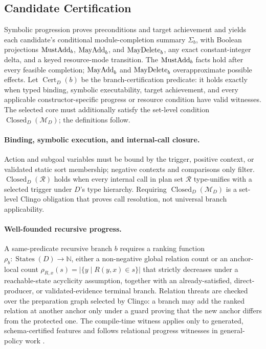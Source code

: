 \subsection{Candidate Certification}

Symbolic progression proves preconditions and target achievement and yields each
candidate's conditional module-completion summary $\Sigma_b$, with Boolean
projections $\mathrm{MustAdd}_b$, $\mathrm{MayAdd}_b$, and $\mathrm{MayDelete}_b$, any exact
constant-integer delta, and a keyed resource-mode transition. The $\mathrm{MustAdd}_b$
facts hold after every feasible completion; $\mathrm{MayAdd}_b$ and $\mathrm{MayDelete}_b$
overapproximate possible effects. Let $\operatorname{Cert}_D(b)$ be the
branch-certification predicate: it holds exactly when typed binding, symbolic
executability, target achievement, and every applicable constructor-specific
progress or resource condition have valid witnesses. The selected core must
additionally satisfy the set-level condition
$\operatorname{Closed}_D(\mathcal M_D)$; the definitions follow.

\paragraph{Binding, symbolic execution, and internal-call closure.}
Action and subgoal variables must be bound by the trigger, positive context, or
validated static sort membership; negative contexts and comparisons only
filter.
$\operatorname{Closed}_D(\mathcal R)$ holds when every internal call in plan set
$\mathcal R$ type-unifies with a selected trigger under $D$'s type hierarchy.
Requiring $\operatorname{Closed}_D(\mathcal M_D)$ is a set-level Clingo
obligation that proves call resolution, not universal branch applicability.

\paragraph{Well-founded recursive progress.}
A same-predicate recursive branch $b$ requires a ranking function
$\rho_b:\operatorname{States}(D)\rightarrow\mathbb N$, either a non-negative
global relation count or an anchor-local count
$\rho_{R,x}(s)=|\{y\mid R(y,x)\in s\}|$ that strictly decreases under a
reachable-state acyclicity assumption, together with an
already-satisfied, direct-producer, or validated-evidence terminal branch.
Relation threats are checked over the preparation graph selected by Clingo: a
branch may add the ranked relation at another anchor only under a guard proving
that the new anchor differs from the protected one. The compile-time witness
applies only to generated, schema-certified features and follows relational
progress witnesses in
general-policy work \cite{Frances2021LearningGeneralPolicies}.

